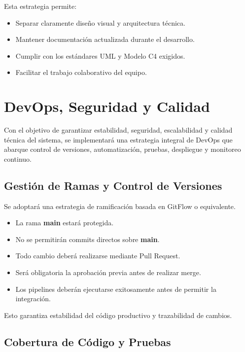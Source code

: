 \documentclass[12pt]{article}
\begin{document}
Esta estrategia permite:

\begin{itemize}
    \item Separar claramente diseño visual y arquitectura técnica.
    \item Mantener documentación actualizada durante el desarrollo.
    \item Cumplir con los estándares UML y Modelo C4 exigidos.
    \item Facilitar el trabajo colaborativo del equipo.
\end{itemize}



\section{DevOps, Seguridad y Calidad}

Con el objetivo de garantizar estabilidad, seguridad, escalabilidad y calidad técnica del sistema, se implementará una estrategia integral de DevOps que abarque control de versiones, automatización, pruebas, despliegue y monitoreo continuo.

\subsection{Gestión de Ramas y Control de Versiones}

Se adoptará una estrategia de ramificación basada en GitFlow o equivalente.

\begin{itemize}
    \item La rama \textbf{main} estará protegida.
    \item No se permitirán commits directos sobre \textbf{main}.
    \item Todo cambio deberá realizarse mediante Pull Request.
    \item Será obligatoria la aprobación previa antes de realizar merge.
    \item Los pipelines deberán ejecutarse exitosamente antes de permitir la integración.
\end{itemize}

Esto garantiza estabilidad del código productivo y trazabilidad de cambios.

\subsection{Cobertura de Código y Pruebas}
\end{document}
